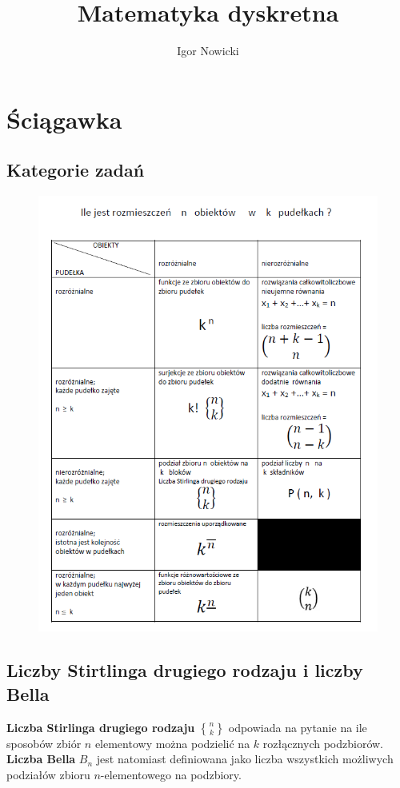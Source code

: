 \documentclass[11pt]{article}
\title{Matematyka dyskretna}
\author{Igor Nowicki}
\theoremstyle{definition}
\numberwithin{zadanie}{subsection}
\begin{document}
\maketitle
\section{Ściągawka}

\subsection{Kategorie zadań}

\begin{figure}[H]
    \centering
    \includegraphics[width=0.7\linewidth]{cheatsheet.png}
\end{figure}

\subsection{Liczby Stirtlinga drugiego rodzaju i liczby Bella}

\textbf{Liczba Stirlinga drugiego rodzaju} $n\brace k$ odpowiada na pytanie na ile sposobów zbiór $n$ elementowy można podzielić na $k$ rozłącznych podzbiorów. \textbf{Liczba Bella} $B_n$ jest natomiast definiowana jako liczba wszystkich możliwych podziałów zbioru $n$-elementowego na podzbiory.
\end{document}

